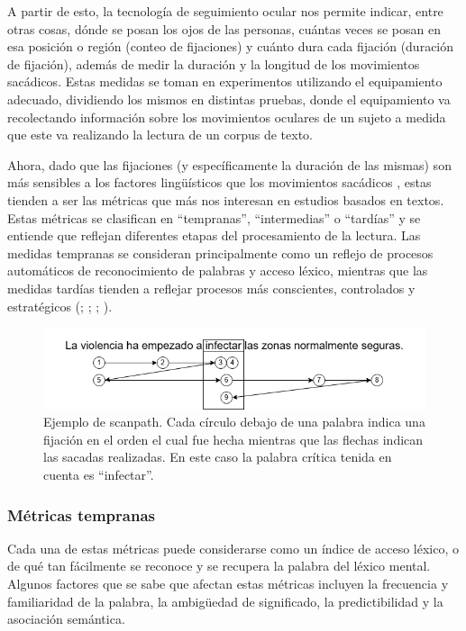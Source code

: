 A partir de esto, la tecnología de seguimiento ocular nos permite indicar, entre otras cosas, dónde se posan los ojos de las personas, cuántas veces se posan en esa posición o región (conteo de fijaciones) y cuánto dura cada fijación (duración de fijación), además de medir la duración y la longitud de los movimientos sacádicos. Estas medidas se toman en experimentos utilizando el equipamiento adecuado, dividiendo los mismos en distintas pruebas, donde el equipamiento va recolectando información sobre los movimientos oculares de un sujeto a medida que este va realizando la lectura de un corpus de texto.

Ahora, dado que las fijaciones (y específicamente la duración de las mismas) son más sensibles a los factores lingüísticos que los movimientos sacádicos \parencite{StaubRayner2007}, estas tienden a ser las métricas que más nos interesan en estudios basados en textos. Estas métricas se clasifican en “tempranas”, “intermedias” o “tardías” y se entiende que reflejan diferentes etapas del procesamiento de la lectura. Las medidas tempranas se consideran principalmente como un reflejo de procesos automáticos de reconocimiento de palabras y acceso léxico, mientras que las medidas tardías tienden a reflejar procesos más conscientes, controlados y estratégicos (\cite{Altarriba1996}; \cite{Inhoff1984}; \cite{Paterson1999}; \cite{StaubRayner2007}).

\begin{figure}[H]
    \centering
    \includegraphics[width=1\textwidth]{imagenes/scanpath.png}
    \caption{Ejemplo de scanpath. Cada círculo debajo de una palabra indica una fijación en el orden el cual fue hecha mientras que las flechas indican las sacadas realizadas. En este caso la palabra crítica tenida en cuenta es “infectar”.}
    \label{fig:scanpath}
\end{figure}

\subsubsection{Métricas tempranas}

Cada una de estas métricas puede considerarse como un índice de acceso léxico, o de qué tan fácilmente se reconoce y se recupera la palabra del léxico mental. Algunos factores que se sabe que afectan estas métricas incluyen la frecuencia y familiaridad de la palabra, la ambigüedad de significado, la predictibilidad y la asociación semántica.

